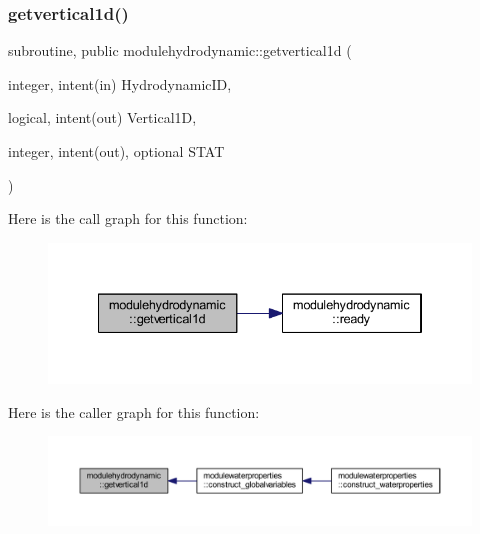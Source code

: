 \subsubsection{\texorpdfstring{getvertical1d()}{getvertical1d()}}
{\footnotesize\ttfamily subroutine, public modulehydrodynamic\+::getvertical1d (\begin{DoxyParamCaption}\item[{integer, intent(in)}]{Hydrodynamic\+ID,  }\item[{logical, intent(out)}]{Vertical1D,  }\item[{integer, intent(out), optional}]{S\+T\+AT }\end{DoxyParamCaption})}

Here is the call graph for this function\+:\nopagebreak
\begin{figure}[H]
\begin{center}
\leavevmode
\includegraphics[width=334pt]{namespacemodulehydrodynamic_a384df1b51bd6ad1c528b5658c4414bae_cgraph}
\end{center}
\end{figure}
Here is the caller graph for this function\+:\nopagebreak
\begin{figure}[H]
\begin{center}
\leavevmode
\includegraphics[width=350pt]{namespacemodulehydrodynamic_a384df1b51bd6ad1c528b5658c4414bae_icgraph}
\end{center}
\end{figure}
\mbox{\label{namespacemodulehydrodynamic_a6f64fd12742f48039f81460df9c0cd42}} 
